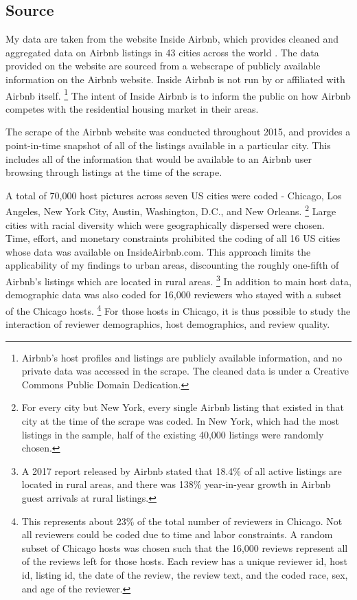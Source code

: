 \subsection{Source} 
	\label{source}
My data are taken from the website Inside Airbnb, which provides cleaned and aggregated data on Airbnb listings in 43 cities across the world \citep{insideairbnb}. The data provided on the website are sourced from a webscrape of publicly available information on the Airbnb website. Inside Airbnb is not run by or affiliated with Airbnb itself.%
	\footnote{Airbnb's host profiles and listings are publicly available information, and no private data was accessed in the scrape. The cleaned data is under a Creative Commons Public Domain Dedication.} 
The intent of Inside Airbnb is to inform the public on how Airbnb competes with the residential housing market in their areas. 

The scrape of the Airbnb website was conducted throughout 2015, and provides a point-in-time snapshot of all of the listings available in a particular city. This includes all of the information that would be available to an Airbnb user browsing through listings at the time of the scrape. 

A total of 70,000 host pictures across seven US cities were coded - Chicago, Los Angeles, New York City, Austin, Washington, D.C., and New Orleans.%
	\footnote{For every city but New York, every single Airbnb listing that existed in that city at the time of the scrape was coded. In New York, which had the most listings in the sample, half of the existing 40,000 listings were randomly chosen.} 
Large cities with racial diversity which were geographically dispersed were chosen. Time, effort, and monetary constraints prohibited the coding of all 16 US cities whose data was available on InsideAirbnb.com. This approach limits the applicability of my findings to urban areas, discounting the roughly one-fifth of Airbnb's listings which are located in rural areas.%
	\footnote{A 2017 report released by Airbnb stated that 18.4\% of all active listings are located in rural areas, and there was 138\% year-in-year growth in Airbnb guest arrivals at rural listings.} 
In addition to main host data, demographic data was also coded for 16,000 reviewers who stayed with a subset of the Chicago hosts.%
	\footnote{This represents about 23\% of the total number of reviewers in Chicago. Not all reviewers could be coded due to time and labor constraints. A random subset of Chicago hosts was chosen such that the 16,000 reviews represent all of the reviews left for those hosts. Each review has a unique reviewer id, host id, listing id, the date of the review, the review text, and the coded race, sex, and age of the reviewer.}
For those hosts in Chicago, it is thus possible to study the interaction of reviewer demographics, host demographics, and review quality.


